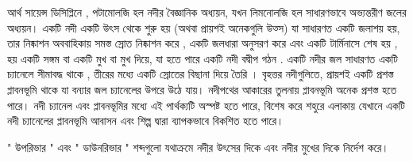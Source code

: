 \documentclass[a4paper,12pt,oneside,final]{article}
\begin{document}
আর্থ সায়েন্স ডিসিপ্লিনে , পটামোলজি হল নদীর বৈজ্ঞানিক অধ্যয়ন, যখন লিমনোলজি হল সাধারণভাবে অভ্যন্তরীণ জলের অধ্যয়ন।
একটি নদী একটি উৎস থেকে শুরু হয় (অথবা প্রায়শই অনেকগুলি উত্স) যা সাধারণত একটি জলাশয় হয়, তার নিষ্কাশন অববাহিকায় সমস্ত স্রোত নিষ্কাশন করে , একটি জলধারা অনুসরণ করে এবং একটি টার্মিনাসে শেষ হয় , হয় একটি সঙ্গম বা একটি মুখ বা মুখ দিয়ে, যা হতে পারে একটি নদী বদ্বীপ গঠন . একটি নদীর জল সাধারণত একটি চ্যানেলে সীমাবদ্ধ থাকে , তীরের মধ্যে একটি স্রোতের বিছানা দিয়ে তৈরি । বৃহত্তর নদীগুলিতে, প্রায়শই একটি প্রশস্ত প্লাবনভূমি থাকে যা বন্যার জল চ্যানেলের উপরে উঠে যায়। নদীপথের আকারের তুলনায় প্লাবনভূমি অনেক প্রশস্ত হতে পারে। নদী চ্যানেল এবং প্লাবনভূমির মধ্যে এই পার্থক্যটি অস্পষ্ট হতে পারে, বিশেষ করে শহুরে এলাকায় যেখানে একটি নদী চ্যানেলের প্লাবনভূমি আবাসন এবং শিল্প দ্বারা ব্যাপকভাবে বিকশিত হতে পারে।

" উপরিভার " এবং " ডাউনরিভার " শব্দগুলো যথাক্রমে নদীর উৎসের দিকে এবং নদীর মুখের দিকে নির্দেশ করে।
\end{document}
